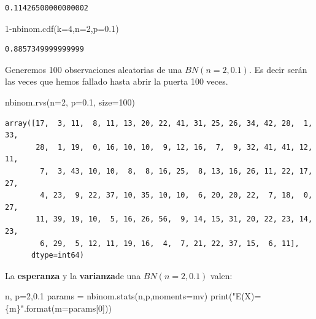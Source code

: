 \documentclass[
  letterpaper,
  DIV=11,
  numbers=noendperiod]{scrreprt}
\newenvironment{Shaded}{\begin{snugshade}}{\end{snugshade}}
\newcommand{\BuiltInTok}[1]{\textcolor[rgb]{0.00,0.23,0.31}{#1}}
\newcommand{\DecValTok}[1]{\textcolor[rgb]{0.68,0.00,0.00}{#1}}
\newcommand{\FloatTok}[1]{\textcolor[rgb]{0.68,0.00,0.00}{#1}}
\newcommand{\NormalTok}[1]{\textcolor[rgb]{0.00,0.23,0.31}{#1}}
\newcommand{\OperatorTok}[1]{\textcolor[rgb]{0.37,0.37,0.37}{#1}}
\newcommand{\SpecialCharTok}[1]{\textcolor[rgb]{0.37,0.37,0.37}{#1}}
\newcommand{\StringTok}[1]{\textcolor[rgb]{0.13,0.47,0.30}{#1}}
\begin{document}
\begin{verbatim}
0.11426500000000002
\end{verbatim}

\begin{Shaded}
\begin{Highlighting}[]
\DecValTok{1}\OperatorTok{{-}}\NormalTok{nbinom.cdf(k}\OperatorTok{=}\DecValTok{4}\NormalTok{,n}\OperatorTok{=}\DecValTok{2}\NormalTok{,p}\OperatorTok{=}\FloatTok{0.1}\NormalTok{)}
\end{Highlighting}
\end{Shaded}

\begin{verbatim}
0.8857349999999999
\end{verbatim}

Generemos 100 observaciones aleatorias de una \(BN(n=2,0.1)\). Es decir
serán las veces que hemos fallado hasta abrir la puerta 100 veces.

\begin{Shaded}
\begin{Highlighting}[]
\NormalTok{nbinom.rvs(n}\OperatorTok{=}\DecValTok{2}\NormalTok{, p}\OperatorTok{=}\FloatTok{0.1}\NormalTok{, size}\OperatorTok{=}\DecValTok{100}\NormalTok{)}
\end{Highlighting}
\end{Shaded}

\begin{verbatim}
array([17,  3, 11,  8, 11, 13, 20, 22, 41, 31, 25, 26, 34, 42, 28,  1, 33,
       28,  1, 19,  0, 16, 10, 10,  9, 12, 16,  7,  9, 32, 41, 41, 12, 11,
        7,  3, 43, 10, 10,  8,  8, 16, 25,  8, 13, 16, 26, 11, 22, 17, 27,
        4, 23,  9, 22, 37, 10, 35, 10, 10,  6, 20, 20, 22,  7, 18,  0, 27,
       11, 39, 19, 10,  5, 16, 26, 56,  9, 14, 15, 31, 20, 22, 23, 14, 23,
        6, 29,  5, 12, 11, 19, 16,  4,  7, 21, 22, 37, 15,  6, 11],
      dtype=int64)
\end{verbatim}

La \textbf{esperanza} y la \textbf{varianza}de una \(BN(n=2,0.1)\)
valen:

\begin{Shaded}
\begin{Highlighting}[]
\NormalTok{n, p}\OperatorTok{=}\DecValTok{2}\NormalTok{,}\FloatTok{0.1}
\NormalTok{params }\OperatorTok{=}\NormalTok{ nbinom.stats(n,p,moments}\OperatorTok{=}\StringTok{\textquotesingle{}mv\textquotesingle{}}\NormalTok{)}
\BuiltInTok{print}\NormalTok{(}\StringTok{"E(X)=}\SpecialCharTok{\{m\}}\StringTok{"}\NormalTok{.}\BuiltInTok{format}\NormalTok{(m}\OperatorTok{=}\NormalTok{params[}\DecValTok{0}\NormalTok{]))}
\end{Highlighting}
\end{Shaded}
\end{document}
